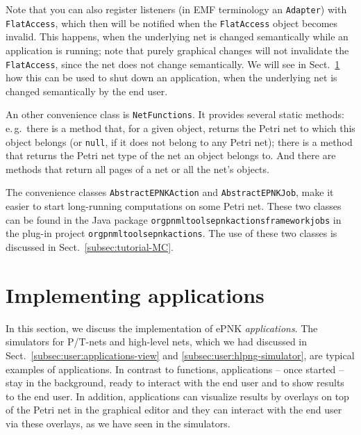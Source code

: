 Note that you can also register listeners (in EMF terminology an {\tt Adapter})
with {\tt FlatAccess}, which then will be notified when the {\tt FlatAccess}
object becomes invalid. This happens, when the underlying net is changed semantically
while an application is running; note that purely graphical changes will not
invalidate the  {\tt FlatAccess}, since the net does not change semantically. 
We will see in Sect.~\ref{subsec:developer:applications} how this can be used
to shut down an application, when the underlying net is changed semantically
by the end user.

An other convenience class is {\tt NetFunctions}.%
It provides several static methods: e.\,g.\ there is a method that, for a
given object, returns the Petri net to which this object belongs (or {\tt null},
if it does not belong to any Petri  net); there is a method that returns the Petri net
type of the net an object belongs to. And there are methods that return
all pages of a net or all the net's objects. 

The convenience classes {\tt AbstractEPNKAction}%
and {\tt AbstractEPNKJob},%
make it easier to start long-running computations on some Petri net. These
two classes can be found in the Java package
{\tt org\qnsep{}pnml\qnsep{}tools\qnsep{}epnk\qnsep{}actions\qnsep{}framework\qnsep{}jobs}
in the plug-in project
{\tt org\qnsep{}pnml\qnsep{}tools\qnsep{}epnk\qnsep{}actions}.
The use of these two classes is discussed in Sect.~\ref{subsec:tutorial-MC}.%

\section{Implementing applications}
\label{subsec:developer:applications}

In this section, we discuss the implementation of ePNK \emph{applications}.
The simulators for P/T-nets and high-level nets, which we had discussed
in Sect.~\ref{subsec:user:applications-view} and \ref{subsec:user:hlpng-simulator},
are typical examples of applications.
In contrast to functions, applications -- once started -- stay in the background,
ready to interact with the end user and to show results to the end user.
In addition, applications can visualize results by overlays
on top of the Petri net in the graphical editor and they can interact with the end user
via these overlays, as we have seen in the simulators.

